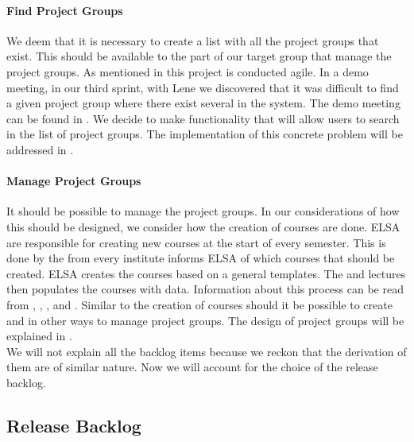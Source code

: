 \paragraph{Find Project Groups}
We deem that it is necessary to create a list with all the project groups that exist.
This should be available to the part of our target group that manage the project groups.
As mentioned in  this project is conducted agile. 
In a demo meeting, in our third sprint, with Lene we discovered that it was difficult to find a given project group where there exist several in the system.
The demo meeting can be found in . 
We decide to make functionality that will allow users to search in the list of project groups.
The implementation of this concrete problem will be addressed in .

\paragraph{Manage Project Groups}
It should be possible to manage the project groups. In our considerations of how this should be designed, we consider how the creation of courses are done. 
ELSA are responsible for creating new courses at the start of every semester. 
This is done by the \admpers{} from every institute informs ELSA of which courses that should be created. 
ELSA creates the courses based on a general templates.
The \admpers{} and lectures then populates the courses with data. 
Information about this process can be read from \appref{}, \secref{},  \appref{}, and \appref{}.
Similar to the creation of courses should it be possible to create and in other ways to manage project groups. 
The design of project groups will be explained in \secref{}. \\

We will not explain all the backlog items because we reckon that the derivation of them are of similar nature.
Now we will account for the choice of the release backlog.

\subsection{Release Backlog}






\begin{comment}
In the interview described in \appref{sec:lene} we learned that there is a need for having a concept of project groups in \moodle{}.  to enhance communication by sending messages from the \admpers{} to project groups through \moodle{}.
This evolves into two backlog items; integrate the concept of project groups into \moodle{} and allow the administrative personnel to post messages to the project group.
The former is represented as a backlog item which can be seen in \figref{fig:productbacklog}.
The latter is implemented by the \supervisorgroup{}.
\end{comment}


